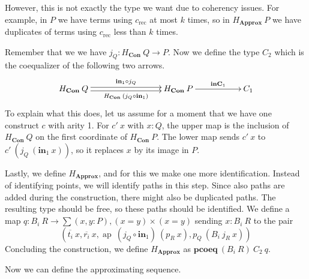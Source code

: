 \documentclass[a4paper,UKenglish]{lipics-v2016}
\newcommand{\Boperator}[1]{\mathrm{\mathbf{#1}}}
\newcommand{\inn}{\Boperator{in}}
\newcommand{\rec}[0]{\operatorname{rec}}
\newcommand{\ap}[0]{\operatorname{ap}}
\newcommand{\Con}[0]{\textbf{Con}}
\newcommand{\Approx}[0]{\textbf{Approx}}
\newcommand{\inC}[0]{\Boperator{inC}}
\newcommand{\pcoeq}[0]{\Boperator{pcoeq}}
\begin{document}
However, this is not exactly the type we want due to coherency issues.
For example, in $P$ we have terms using $c_{\rec}$ at most $k$ times, so in $H_{\Approx} \> P$ we have duplicates of terms using $c_{\rec}$ less than $k$ times.

Remember that we we have $j_Q : H_{\Con} \> Q \rightarrow P$.
Now we define the type $C_2$ which is the coequalizer of the following two arrows.
\[
\xymatrix
{
        H_{\Con} \> Q \ar@<-.5ex>[rrr]_-{H_{\Con} \> (j_Q \circ \inn_1)} \ar@<.5ex>[rrr]^-{\inn_1 \circ j_Q} & & & H_{\Con} \> P \ar[rr]^-{\inC_1} & & C_1
}
\]
To explain what this does, let us assume for a moment that we have one construct $c$ with arity 1.
For $c' \> x$ with $x : Q$, the upper map is the inclusion of $H_{\Con} \> Q$ on the first coordinate of $H_{\Con} \> P$.
The lower map sends $c' \> x$ to $c' \> (j_Q \> (\inn_1 \> x))$, so it replaces $x$ by its image in $P$.

Lastly, we define $H_\Approx$, and for this we make one more identification.
Instead of identifying points, we will identify paths in this step.
Since also paths are added during the construction, there might also be duplicated paths.
The resulting type should be free, so these paths should be identified.
We define a map $q : B_i \> R \rightarrow \sum (x, y : P), (x = y) \times (x = y)$ sending $x : B_i \> R$ to the pair
\[
(\overline{t_i} \> x, \overline{r_i} \> x, \ap \> (j_Q \circ \inn_1) \> (p_R \> x), p_Q \> (B_i \> j_R \> x))
\]
Concluding the construction, we define $H_{\Approx}$ as $\pcoeq \> (B_i \> R) \> C_2 \> q$.

Now we can define the approximating sequence.
\end{document}
